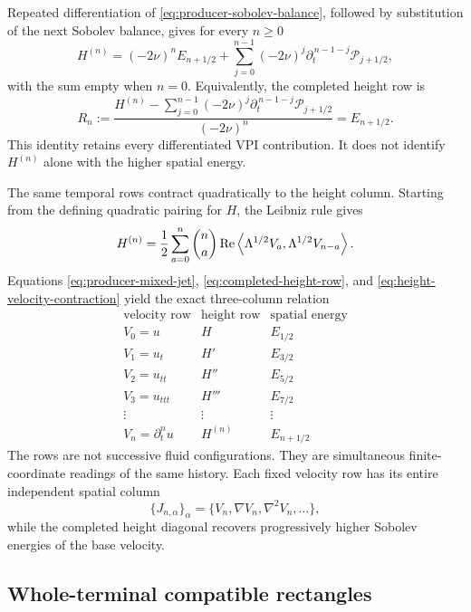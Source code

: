 Repeated differentiation of \eqref{eq:producer-sobolev-balance}, followed by
substitution of the next Sobolev balance, gives for every \(n\geq0\)
\begin{equation}
 H^{(n)}
 =(-2\nu)^nE_{n+1/2}
 +\sum_{j=0}^{n-1}(-2\nu)^j
 \partial_t^{\,n-1-j}\mathcal P_{j+1/2},
 \label{eq:height-tower}
\end{equation}
with the sum empty when \(n=0\).  Equivalently, the completed height row is
\begin{equation}
 R_n
 :=\frac{H^{(n)}-
 \displaystyle\sum_{j=0}^{n-1}(-2\nu)^j
 \partial_t^{\,n-1-j}\mathcal P_{j+1/2}}
 {(-2\nu)^n}
 =E_{n+1/2}.
 \label{eq:completed-height-row}
\end{equation}
This identity retains every differentiated VPI contribution.  It does not
identify \(H^{(n)}\) alone with the higher spatial energy.

The same temporal rows contract quadratically to the height column.  Starting
from the defining quadratic pairing for \(H\), the Leibniz rule gives
\begin{equation}
 H^{(n)}
 =\frac12\sum_{a=0}^{n}\binom na
 \operatorname{Re}\left\langle \Lambda^{1/2}V_a,\Lambda^{1/2}V_{n-a}\right\rangle.
 \label{eq:height-velocity-contraction}
\end{equation}
Equations \eqref{eq:producer-mixed-jet}, \eqref{eq:completed-height-row}, and
\eqref{eq:height-velocity-contraction} yield the exact three-column relation
\[
\begin{array}{c|c|c}
\text{velocity row}&\text{height row}&\text{spatial energy}\\
\hline
V_0=u&H&E_{1/2}\\
V_1=u_t&H'&E_{3/2}\\
V_2=u_{tt}&H''&E_{5/2}\\
V_3=u_{ttt}&H'''&E_{7/2}\\
\vdots&\vdots&\vdots\\
 V_n=\partial_t^nu&H^{(n)}&E_{n+1/2}
\end{array}
\]
The rows are not successive fluid configurations.  They are simultaneous
finite-coordinate readings of the same history.  Each fixed velocity row has
its entire independent spatial column
\[
 \{J_{n,\alpha}\}_{\alpha}
 =\{V_n,\nabla V_n,\nabla^2V_n,\ldots\},
\]
while the completed height diagonal recovers progressively higher Sobolev
energies of the base velocity.

\subsection{Whole-terminal compatible rectangles}

